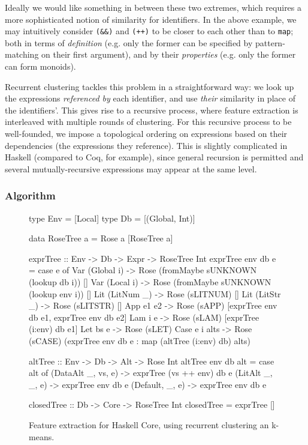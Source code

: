 Ideally we would like something in between these two extremes, which requires a more sophisticated notion of similarity for identifiers. In the above example, we may intuitively consider \texttt{(\&\&)} and \texttt{(++)} to be closer to each other than to \texttt{map}; both in terms of \emph{definition} (e.g. only the former can be specified by pattern-matching on their first argument), and by their \emph{properties} (e.g. only the former can form monoids).

Recurrent clustering tackles this problem in a straightforward way: we look up the expressions \emph{referenced by} each identifier, and use \emph{their} similarity in place of the identifiers'. This gives rise to a recursive process, where feature extraction is interleaved with multiple rounds of clustering. For this recursive process to be well-founded, we impose a topological ordering on expressions based on their dependencies (the expressions they reference). This is slightly complicated in Haskell (compared to Coq, for example), since general recursion is permitted and several mutually-recursive expressions may appear at the same level.

\subsubsection{Algorithm}

\begin{figure}
  \begin{haskell}
    type Env = [Local]
    type Db  = [(Global, Int)]

    data RoseTree a = Rose a [RoseTree a]

    exprTree :: Env -> Db -> Expr -> RoseTree Int
    exprTree env db e = case e of
      Var (Global i) -> Rose (fromMaybe sUNKNOWN (lookup db  i)) []
      Var (Local  i) -> Rose (fromMaybe sUNKNOWN (lookup env i)) []
      Lit (LitNum _) -> Rose (sLITNUM) []
      Lit (LitStr _) -> Rose (sLITSTR) []
      App  e1 e2     -> Rose (sAPP) [exprTree    env  db e1,
                                     exprTree    env  db e2]
      Lam  i  e      -> Rose (sLAM) [exprTree (i:env) db e1]
      Let  bs e      -> Rose (sLET)
      Case e i alts  -> Rose (sCASE) (exprTree env db e : map (altTree (i:env) db) alts)

    altTree :: Env -> Db -> Alt -> Rose Int
    altTree env db alt = case alt of
      (DataAlt _, vs, e) -> exprTree (vs ++ env) db e
      (LitAlt  _, _,  e) -> exprTree env db e
      (Default,   _,  e) -> exprTree env db e

    closedTree :: Db -> Core -> RoseTree Int
    closedTree = exprTree []
  \end{haskell}
  \caption{Feature extraction for Haskell Core, using recurrent clustering an k-means.}
  \label{featureextractionalgorithm}
\end{figure}

